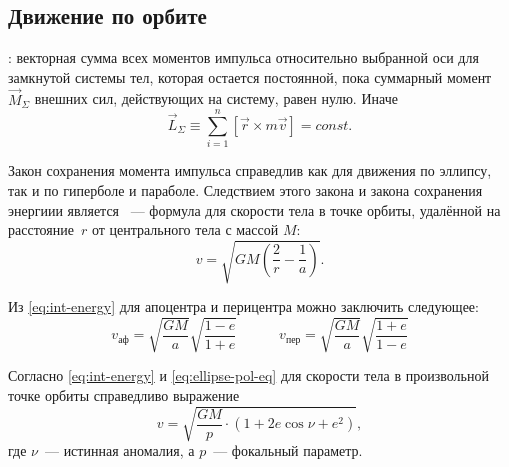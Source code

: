 \subsection{Движение по орбите}

:  векторная сумма всех моментов 
импульса относительно выбранной оси для замкнутой системы тел, которая остается 
постоянной, пока суммарный момент $\vec{M}_\Sigma$ внешних сил, действующих на систему, равен нулю. Иначе
\begin{equation}
\vec{L}_\Sigma \equiv \sum\limits_{i=1}^{n} \left[ \vec{r} \times m \vec{v} \right] = const.
\end{equation}

Закон сохранения момента импульса справедлив как для движения по эллипсу, так и по
гиперболе и параболе. Следствием этого закона и закона сохранения энергиии 
является ~--- формула для скорости тела в точке орбиты, удалённой на расстояние~$r$ от центрального тела с массой $M$:
\begin{equation}
v = \sqrt{ GM \left( \frac{2}{r} - \frac{1}{a} \right)}.
\label{eq:int-energy}
\end{equation}

Из \eqref{eq:int-energy} для апоцентра и перицентра можно заключить следующее:
\begin{equation}v_{\text{аф}}=\sqrt{\frac{GM}{a}} \sqrt{\frac{1-e}{1+e}}
\quad\quad\quad v_{\text{пер}}=\sqrt{\frac{GM}{a}}\sqrt{\frac{1+e}{1-e}}
\end{equation}

Согласно \eqref{eq:int-energy} и \eqref{eq:ellipse-pol-eq} для скорости тела в произвольной точке орбиты справедливо выражение
\begin{equation}
v = \sqrt{\frac{GM}{p}\cdot(1 + 2 e \cos \nu + e^2)},
\end{equation}
где $\nu$~--- истинная аномалия, а $p$~--- фокальный параметр.
